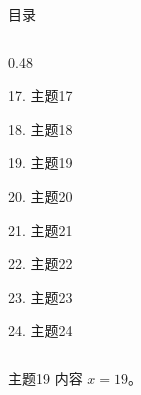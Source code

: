 \documentclass[aspectratio=169,10pt,fontset=fandol]{ctexbeamer}
\begin{document}
\begin{frame}[t,fragile]{目录}
\begin{columns}[T,onlytextwidth]
\begin{column}{0.48\textwidth}
{\color{black}\small 17. 主题17\par}\vspace{0.22em}
{\color{black}\small 18. 主题18\par}\vspace{0.22em}
{\color{blue}\small 19. 主题19\par}\vspace{0.22em}
{\color{gray!40}\small 20. 主题20\par}\vspace{0.22em}
{\color{gray!40}\small 21. 主题21\par}\vspace{0.22em}
{\color{gray!40}\small 22. 主题22\par}\vspace{0.22em}
{\color{gray!40}\small 23. 主题23\par}\vspace{0.22em}
{\color{gray!40}\small 24. 主题24\par}\vspace{0.22em}
\end{column}
\end{columns}
\end{frame}
\begin{frame}[t,fragile]{主题19}
\normalsize
{\normalsize
内容 $x=19$。
}
\end{frame}
\end{document}
